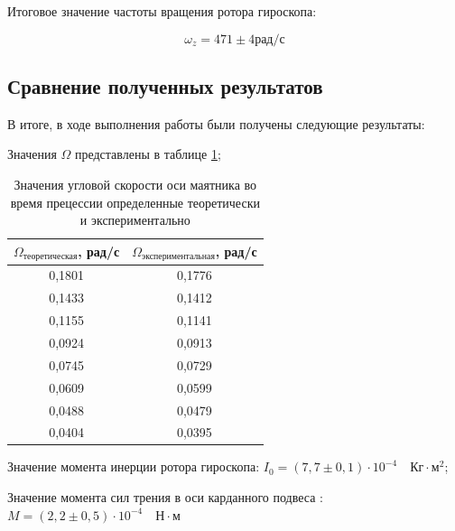 \documentclass[12pt,a4paper]{article}
\begin{document}
Итоговое значение частоты вращения ротора гироскопа:

\begin{equation}
	\omega_{z} = 471 \pm 4 \text{рад/с}
\end{equation}

\subsection{Сравнение полученных результатов}

В итоге, в ходе выполнения работы были получены следующие результаты:

Значения $\Omega$ представлены в таблице \ref{tab:final_table};

\begin{table}[h!]
\centering
\begin{tabular}{|c|c|}
\hline
$\Omega_{\text{теоретическая}}$, рад/с & $\Omega_{\text{экспериментальная}}$, рад/с \\ \hline
0,1801              & 0,1776                  \\ \hline
0,1433              & 0,1412                  \\ \hline
0,1155              & 0,1141                  \\ \hline
0,0924              & 0,0913                  \\ \hline
0,0745              & 0,0729                  \\ \hline
0,0609              & 0,0599                  \\ \hline
0,0488              & 0,0479                  \\ \hline
0,0404              & 0,0395                  \\ \hline
\end{tabular}
\caption{Значения угловой скорости оси маятника во время прецессии определенные теоретически и экспериментально}
\label{tab:final_table}
\end{table}
 
Значение момента инерции ротора гироскопа: $I_{0} = \left( 7,7 \pm 0,1 \right) \cdot 10^{-4}\quad \text{Кг} \cdot \text{м}^{2}$;

Значение момента сил трения в оси карданного подвеса : $M = (2,2 \pm 0,5)\cdot 10^{-4}\quad \text{Н}\cdot\text{м}$
\newpage
\end{document}

